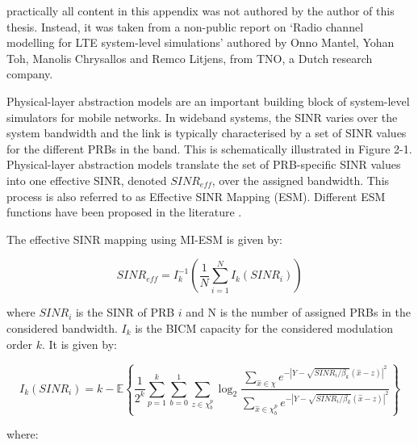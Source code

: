 \label{ap:miesm}

 practically all content in this appendix was not authored by the author of this thesis. Instead, it was taken from a non-public report on `Radio channel modelling for LTE system-level simulations' authored by Onno Mantel, Yohan Toh, Manolis Chrysallos and Remco Litjens, from TNO, a Dutch research company.

Physical-layer abstraction models are an important building block of system-level simulators for mobile networks. In wideband systems, the \acs{SINR} varies over the system bandwidth and the link is typically characterised by a set of SINR values for the different \acsp{PRB} in the band. This is schematically illustrated in Figure 2-1. Physical-layer abstraction models translate the set of PRB-specific SINR values into one effective SINR, denoted $SINR_{eff}$, over the assigned bandwidth. This process is also referred to as Effective SINR Mapping (ESM). Different ESM functions have been proposed in the literature \cite{1651855}.



The effective SINR mapping using MI-ESM is given by:

\begin{equation} \label{eq:miesm2}
    SINR_{eff} = I_k^{-1} \left( \frac{1}{N} \sum_{i=1}^N I_k\left(SINR_i\right)\right)
\end{equation}

where $SINR_i$ is the SINR of PRB $i$ and N is the number of assigned PRBs in the considered bandwidth. $I_k$ is the \ac{BICM} capacity for the considered modulation order $k$. It is given by:


\begin{equation}
    I_k(SINR_i) = k - \mathbb{E}\left\{ \frac{1}{2^k} \sum_{p=1}^k \sum_{b=0}^1 \sum_{z \in \mathcal{\chi}_b^p} \log_2 \frac{\sum_{\hat{x} \in \chi} e^{- \left| Y - \sqrt{SINR_i / \beta_k} (\hat{x} - z)  \right|^2}}{\sum_{\hat{x} \in \chi_b^p} e^{- \left| Y - \sqrt{SINR_i / \beta_k} (\hat{x} - z)  \right|^2}}\right\} 
\end{equation}


where:


